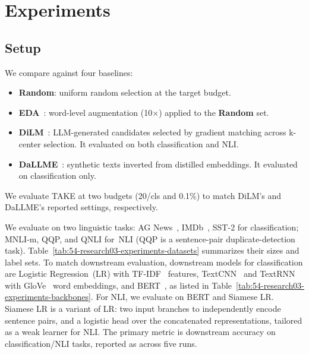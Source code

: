 \section{Experiments} \label{sec:54-research03-experiments}

\subsection{Setup} \label{sec:54-research03-experiments-setup}
\begin{foldable} %
  We compare against four baselines:
  \begin{itemize}
    \item \textbf{Random}: uniform random selection at the target budget.
    \item \textbf{EDA}~\cite{wei2019eda}: word-level augmentation (10$\times$) applied to the \textbf{Random} set.
    \item \textbf{DiLM}~\cite{maekawa2024dilm}: \ac{LLM}-generated candidates selected by gradient matching across k-center selection. It evaluated on both classification and \ac{NLI}.
    \item \textbf{DaLLME}~\cite{tao2024textual}: synthetic texts inverted from distilled embeddings. It evaluated on classification only.
  \end{itemize}
  We evaluate TAKE at two budgets (20/cls and 0.1\%) to match DiLM's and DaLLME's reported settings, respectively.
\end{foldable}
    
\begin{foldable} %
  We evaluate on two linguistic tasks: AG News~\cite{zhang2015character}, IMDb~\cite{maas2011learning}, SST-2 for classification; MNLI-m, QQP, and QNLI for~\ac{NLI} (QQP is a sentence-pair duplicate-detection task).
  Table~\ref{tab:54-research03-experiments-datasets} summarizes their sizes and label sets.
  To match downstream evaluation, downstream models for classification are Logistic Regression~(LR) with TF-IDF~\cite{salton1988term} features, TextCNN~\cite{kim2014convolutional} and TextRNN~\cite{liu2016recurrent} with GloVe~\cite{pennington2014glove} word embeddings, and BERT~\cite{devlin2019bert}, as listed in Table~\ref{tab:54-research03-experiments-backbones}.
  For \ac{NLI}, we evaluate on BERT and Siamese LR.
  Siamese LR is a variant of LR: two input branches to independently encode sentence pairs, and a logistic head over the concatenated representations, tailored as a weak learner for \ac{NLI}.
  The primary metric is downstream accuracy on classification/\ac{NLI} tasks, reported as  across five runs.
\end{foldable}

